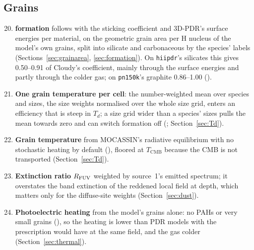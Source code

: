 \subsection{Grains}
\begin{enumerate}\setcounter{enumi}{19}
\item \textbf{\Htwo{} formation} follows
  \citet{CazauxTielens2002,CazauxTielens2004} with the
  \citet{HollenbachMcKee1979} sticking coefficient and 3D-PDR's surface
  energies per material, on the geometric grain area per H nucleus of the
  model's own grains, split into silicate and carbonaceous by the species'
  labels (Sections~\ref{sec:grainarea}, \ref{sec:formation}). On
  \texttt{hiipdr}'s silicates this gives 0.50--0.91 of Cloudy's coefficient,
  mainly through the surface energies and partly through the colder gas; on
  \texttt{pn150k}'s graphite 0.86--1.00 ().
\item \textbf{One grain temperature per cell}: the number-weighted mean over
  species and sizes, the size weights normalised over the whole size grid,
  enters an efficiency that is steep in $T_d$; a size grid wider than a
  species' sizes pulls the mean towards zero and can switch formation off
  (; Section~\ref{sec:Td}).
\item \textbf{Grain temperature} from MOCASSIN's radiative equilibrium with no
  stochastic heating by default (), floored at $T_{\mathrm{CMB}}$ because
  the CMB is not transported (Section~\ref{sec:Td}).
\item \textbf{Extinction ratio} $R_{\mathrm{FUV}}$ weighted by source~1's emitted
  spectrum; it overstates the band extinction of the reddened local field at
  depth, which matters only for the diffuse-site weights (Section~\ref{sec:dust}).
\item \textbf{Photoelectric heating} from the model's grains alone: no PAHs or
  very small grains (), so the heating is lower than PDR models with
  the \citet{BakesTielens1994} prescription would have at the same field, and
  the gas colder (Section~\ref{sec:thermal}).
\end{enumerate}


